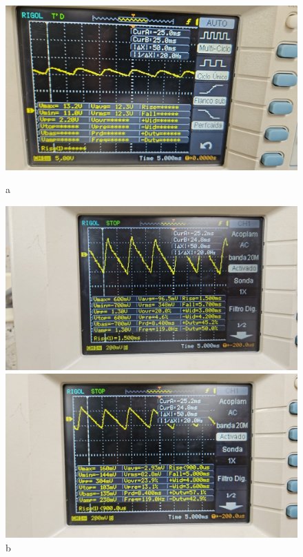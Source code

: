 \documentclass[10pt,letterpaper]{article}
\begin{document}
\begin{figure}[H]
    \centering
        \begin{minipage}[b]{0.45\textwidth}
        \centering
        \includegraphics[scale=0.2]{Filtrado8.jpg}
        \caption*{a}
    \end{minipage}
    \begin{minipage}[b]{0.45\textwidth}
        \centering
        \includegraphics[scale=0.2]{Filtrado1.jpg}
        \caption*{b}
    \end{minipage}    
    \hfill
    \begin{minipage}[b]{0.45\textwidth}
        \centering
        \includegraphics[scale=0.2]{Filtrado2.jpg}

\end{minipage}
\end{figure}
\end{document}
